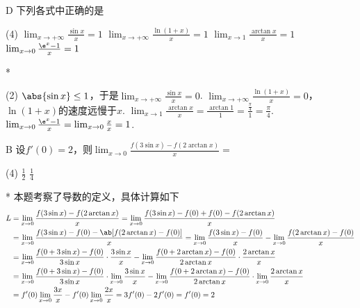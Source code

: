 \begin{choice}{D}
    下列各式中正确的是
    \begin{tasks}(4)
        \task $\lim_{x\to +\infty} \frac{\sin x}{x}=1$
        \task $\lim_{x\to +\infty} \frac{\ln(1+x)}{x}=1$
        \task $\lim_{x\to 1} \frac{\arctan x}{x}=1$
        \task $\lim_{x\to 0} \frac{\e^x-1}{x}=1$
    \end{tasks}
\end{choice}
\begin{solution}*
    \begin{tasks}(2)
        \task\color{solutioncolor} $\abs{\sin x}\leq 1$，于是$\lim_{x\to +\infty} \frac{\sin x}{x}=0$.
        \task\color{solutioncolor} $\lim_{x\to +\infty} \frac{\ln(1+x)}{x}=0$，$\ln(1+x)$的速度远慢于$x$.
        \task\color{solutioncolor} $\lim_{x\to 1} \frac{\arctan x}{x}=\frac{\arctan 1}{1}=\frac{\frac{\pi}{4}}{1}=\frac{\pi}{4}$.
        \task\color{solutioncolor} $\lim_{x\to 0} \frac{\e^x-1}{x}=\lim_{x\to 0} \frac{x}{x}=1$.
    \end{tasks}
\end{solution}

\begin{choice}{B}
   设$f'(0) =2$，则$\lim_{x\to 0} \frac{f(3\sin x)-f(2\arctan x)}{x}=$
   \begin{tasks}(4)
    \task $\frac{1}{2}$
    \task $\frac{1}{4}$
    \end{tasks}
\end{choice}
\begin{solution}*
    本题考察了导数的定义，具体计算如下
    \[
    \begin{aligned}
        L &= \lim_{x\to 0} \frac{f(3\sin x)-f(2\arctan x)}{x}= \lim_{x\to 0} \frac{f(3\sin x)-f(0) +f(0) -f(2\arctan x)}{x} \\
          &= \lim_{x\to 0} \frac{f(3\sin x)-f(0) -\ab[f(2\arctan x) -f(0) ]}{x}= \lim_{x\to 0} \frac{f(3\sin x)-f(0)}{x}-\lim_{x\to 0} \frac{f(2\arctan x) -f(0)}{x} \\
          &= \lim_{x\to 0} \frac{f(0+3\sin x)-f(0)}{3\sin x}\cdot \frac{3\sin x}{x}-\lim_{x\to 0} \frac{f(0+2\arctan x)-f(0)}{2\arctan x}\cdot \frac{2\arctan x}{x} \\
          &= \lim_{x\to 0} \frac{f(0+3\sin x)-f(0)}{3\sin x}\cdot \lim_{x\to 0} \frac{3\sin x}{x}-\lim_{x\to 0} \frac{f(0+2\arctan x)-f(0)}{2\arctan x}\cdot \lim_{x\to 0} \frac{2\arctan x}{x} \\
          &= f'(0) \lim_{x\to 0} \frac{3x}{x}-f'(0) \lim_{x\to 0} \frac{2x}{x}= 3f'(0) -2f'(0)= f'(0) = 2
    \end{aligned}
    \]
\end{solution}

